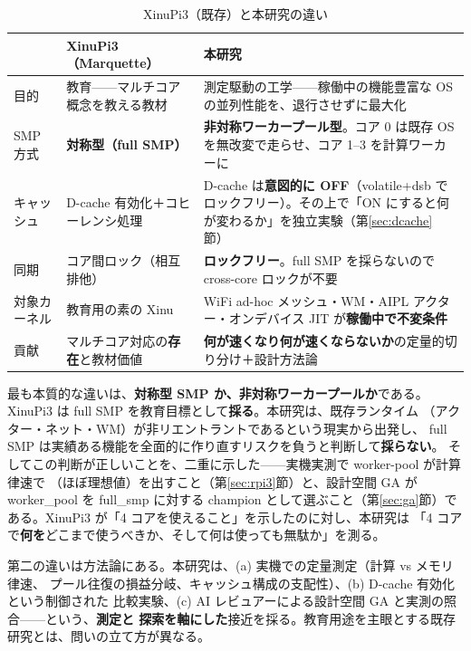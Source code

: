 \begin{table}[htbp]
\centering
\caption{XinuPi3（既存）と本研究の違い}
\small
\begin{tabularx}{\textwidth}{@{}lXX@{}}
\toprule
 & \textbf{XinuPi3（Marquette）} & \textbf{本研究} \\
\midrule
目的 & 教育——マルチコア概念を教える教材 & 測定駆動の工学——稼働中の機能豊富な OS の並列性能を、退行させずに最大化 \\
SMP 方式 & \textbf{対称型（full SMP）} & \textbf{非対称ワーカープール型}。コア 0 は既存 OS を無改変で走らせ、コア 1--3 を計算ワーカーに \\
キャッシュ & D-cache 有効化＋コヒーレンシ処理 & D-cache は\textbf{意図的に OFF}（volatile+dsb でロックフリー）。その上で「ON にすると何が変わるか」を独立実験（第\ref{sec:dcache}節） \\
同期 & コア間ロック（相互排他） & \textbf{ロックフリー}。full SMP を採らないので cross-core ロックが不要 \\
対象カーネル & 教育用の素の Xinu & WiFi ad-hoc メッシュ・WM・AIPL アクター・オンデバイス JIT が\textbf{稼働中で不変条件} \\
貢献 & マルチコア対応の\textbf{存在}と教材価値 & \textbf{何が速くなり何が速くならないか}の定量的切り分け＋設計方法論 \\
\bottomrule
\end{tabularx}
\end{table}

\noindent
最も本質的な違いは、\textbf{対称型 SMP か、非対称ワーカープールか}である。
XinuPi3 は full SMP を教育目標として\textbf{採る}。本研究は、既存ランタイム
（アクター・ネット・WM）が非リエントラントであるという現実から出発し、
full SMP は実績ある機能を全面的に作り直すリスクを負うと判断して\textbf{採らない}。
そしてこの判断が正しいことを、二重に示した——実機実測で worker-pool が計算律速で
（ほぼ理想値）を出すこと（第\ref{sec:rpi3}節）と、設計空間 GA が
worker\_pool を full\_smp に対する champion として選ぶこと（第\ref{sec:ga}節）で
ある。XinuPi3 が「4 コアを使えること」を示したのに対し、本研究は
「4 コアで\textbf{何を}どこまで使うべきか、そして何は使っても無駄か」を測る。

第二の違いは方法論にある。本研究は、(a) 実機での定量測定（計算 vs メモリ律速、
プール往復の損益分岐、キャッシュ構成の支配性）、(b) D-cache 有効化という制御された
比較実験、(c) AI レビュアーによる設計空間 GA と実測の照合——という、\textbf{測定と
探索を軸にした}接近を採る。教育用途を主眼とする既存研究とは、問いの立て方が異なる。
